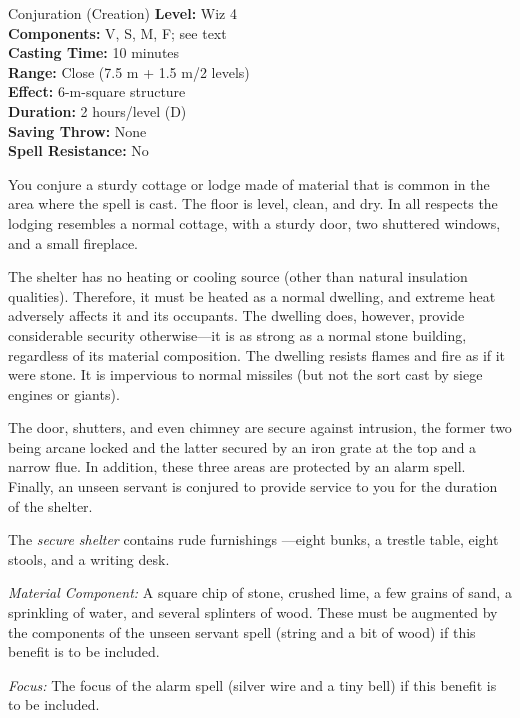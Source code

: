 {Conjuration (Creation)}
{
	\textbf{Level:}
	Wiz 4\\
	\textbf{Components:}
	V, S, M, F; see text\\
	\textbf{Casting Time:}
	10 minutes\\
	\textbf{Range:}
	Close (7.5 m + 1.5 m/2 levels)\\
	\textbf{Effect:}
	6-m-square structure\\
	\textbf{Duration:}
	2 hours/level (D)\\
	\textbf{Saving Throw:}
	None\\
	\textbf{Spell Resistance:}
	No\\
}
{
	You conjure a sturdy cottage or lodge made of material that is common in the area where the spell is cast. The floor is level, clean, and dry. In all respects the lodging resembles a normal cottage, with a sturdy door, two shuttered windows, and a small fireplace.

	The shelter has no heating or cooling source (other than natural insulation qualities). Therefore, it must be heated as a normal dwelling, and extreme heat adversely affects it and its occupants. The dwelling does, however, provide considerable security otherwise---it is as strong as a normal stone building, regardless of its material composition. The dwelling resists flames and fire as if it were stone. It is impervious to normal missiles (but not the sort cast by siege engines or giants).

	The door, shutters, and even chimney are secure against intrusion, the former two being arcane locked and the latter secured by an iron grate at the top and a narrow flue. In addition, these three areas are protected by an alarm spell. Finally, an unseen servant is conjured to provide service to you for the duration of the shelter.

	The \emph{secure shelter} contains rude furnishings ---eight bunks, a trestle table, eight stools, and a writing desk.

	\textit{Material Component:}
	A square chip of stone, crushed lime, a few grains of sand, a sprinkling of water, and several splinters of wood. These must be augmented by the components of the unseen servant spell (string and a bit of wood) if this benefit is to be included.

	\textit{Focus:}
	The focus of the alarm spell (silver wire and a tiny bell) if this benefit is to be included.

}
